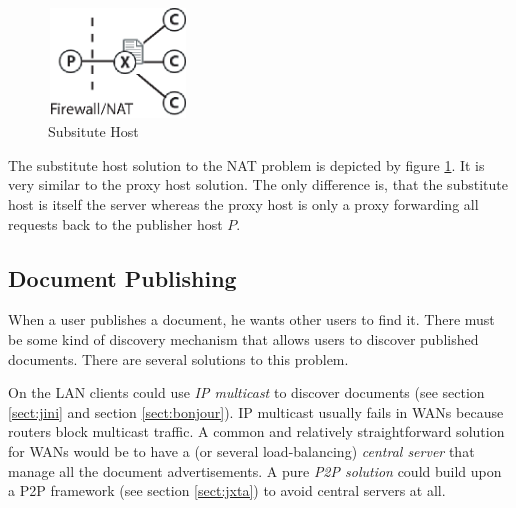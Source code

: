 \begin{figure}[H]
 \centering
 \includegraphics[width=3.7cm,height=2.9cm]{../../images/net_substitute.eps}
 \caption{Subsitute Host}
 \label{fig:substitute}
\end{figure}

The substitute host solution to the NAT problem is depicted by figure \ref{fig:substitute}. It is very similar to the proxy host solution. The only difference is, that the substitute host is itself the server whereas the proxy host is only a proxy forwarding all requests back to the publisher host $P$.


\subsection{Document Publishing}
When a user publishes a document, he wants other users to find it. There must be some kind of discovery mechanism that allows users to discover published documents. There are several solutions to this problem. 

On the LAN clients could use \emph{IP multicast} to discover documents (see section \ref{sect:jini} and section \ref{sect:bonjour}). IP multicast usually fails in WANs because routers block multicast traffic. A common and relatively straightforward solution for WANs would be to have a (or several load-balancing) \emph{central server} that manage all the document advertisements. A pure \emph{P2P solution} could build upon a P2P framework (see section \ref{sect:jxta}) to avoid central servers at all.
